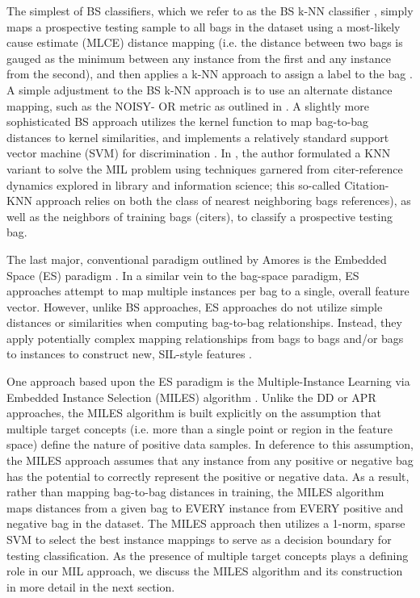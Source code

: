 \documentclass[12pt,dvips]{report}
\numberwithin{equation}{section}
\begin{document}
The simplest of  BS classifiers, which we refer to as the BS k-NN classifier \cite{amor13}, simply maps a prospective testing sample to all bags in the dataset using a most-likely cause estimate  (MLCE) distance mapping (i.e. the distance between two bags is gauged as the minimum between any instance from the first and any instance from the second), and then applies a k-NN approach to assign a label to the bag \cite{amor13, Wang00lazylearning}. A simple adjustment to the BS k-NN approach is to use an alternate distance mapping, such as the NOISY- OR metric as outlined in \cite{amor13}. A slightly more sophisticated BS approach utilizes the kernel function to map bag-to-bag distances to kernel similarities, and implements a relatively standard support vector machine (SVM) for discrimination \cite{amor13, chapelle1999support}.  In \cite{Wang00lazylearning}, the author formulated a KNN variant to solve the MIL problem using techniques garnered from citer-reference dynamics explored in library and information science; this so-called Citation-KNN approach relies on both the class of nearest neighboring bags references), as well as the neighbors of training bags (citers), to classify a prospective testing bag.  

The last major, conventional paradigm outlined by Amores is the Embedded Space (ES) paradigm \cite{amor13}. In a similar vein to the bag-space paradigm, ES approaches attempt to map multiple instances per bag to a single, overall feature vector. However, unlike BS approaches, ES approaches do not utilize simple distances or similarities when computing bag-to-bag relationships.  Instead, they apply potentially complex mapping relationships from bags to bags and/or bags to instances to construct new, SIL-style features \cite{amor13}. 

One approach based upon the ES paradigm is the Multiple-Instance Learning via Embedded Instance Selection (MILES) algorithm \cite{chen06_miles}. Unlike the DD or APR approaches, the MILES algorithm is built explicitly on the assumption that multiple target concepts (i.e. more than a single point or region in the feature space) define
the nature of positive data samples. In deference to this assumption, the MILES approach assumes that any instance from any positive or negative bag has the potential to correctly represent the positive or negative data. As a result, rather than mapping bag-to-bag distances in training, the MILES algorithm maps distances from a given bag to EVERY instance from EVERY positive and negative bag in the dataset. The MILES approach then utilizes a 1-norm, sparse SVM to select the best instance mappings to serve as a decision boundary for testing classification. As the presence of multiple target concepts plays a defining role in our MIL approach, we discuss the MILES algorithm and its construction in more detail in the next section.
\end{document}
